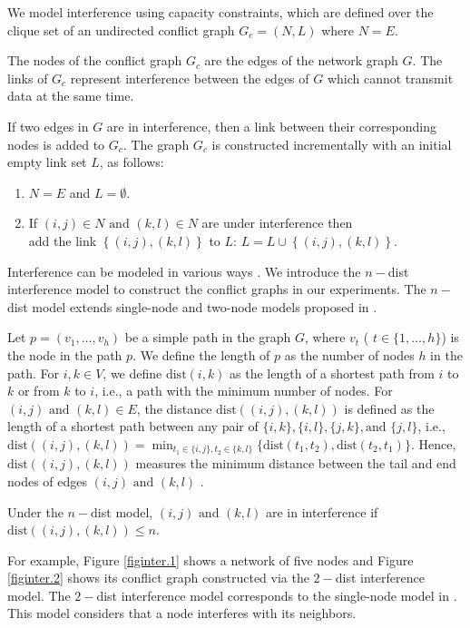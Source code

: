    We model interference using capacity constraints, which are defined over the clique set of an undirected conflict graph \(G_c = (N, L) \) where \(N = E\).
   
  The nodes of the conflict graph \(G_c\) are the edges of the network graph \(G\). The links of \(G_c\) represent interference between the edges of \(G\) which cannot transmit data at the same time.
 
 If two edges in \(G\) are in interference, then a link between their corresponding nodes is added to \(G_c\).
 The graph \(G_c\) is constructed incrementally with an initial empty link set \(L\), as follows:
\begin{enumerate}
    \item \(N = E\) and \(L = \emptyset\).
    \item If \((i,j) \in N \text{ and } (k,l)\in N \) are under interference then \\
      add  the link  \(\left\{(i,j), (k,l)\right\}\) to \( L \): \( L = L \cup \left\{(i,j),  (k,l) \right\}\).
\end{enumerate}

  Interference can be modeled in various ways \cite{gupta2000capacity}. We introduce the \(n-\)dist interference model to construct the conflict graphs in our experiments. The \(n-\)dist model extends single-node and two-node models proposed in \cite{chaporkar2008throughput}.
 
   Let $p=(v_1,\hdots,v_h)$ be a simple path in the graph $G$, where $v_t$ ( $t \in \{1,\hdots,h\}$) is the node in the path $p$. We define the length of $p$ as the number of nodes $h$ in the path. For $i,k \in V$, we define $\textrm{dist}(i,k)$ as the length of a shortest path from $i$ to $k$ or from $k$ to $i$, i.e., a path with the minimum number of nodes. For \((i,j) \text{ and } (k,l) \in E\), the distance \(\textrm{dist}\left ((i,j), (k,l)\right)\) is defined as the length of a shortest path between any pair of \(\{i, k\}, \{i, l\}, \{j, k\}, \text{and } \{j, l\}\), i.e., $\textrm{dist}\left ((i,j),  (k,l)\right) = \min_{t_1\in\{i,j\},  t_2 \in \{ k,l\}}\{\textrm{dist}(t_1, t_2), \textrm{dist}(t_2, t_1)\}$. Hence, $\textrm{dist}\left ((i,j),  (k,l)\right)$ measures the minimum distance between the tail and end nodes of edges  \((i,j) \text{ and } (k,l)\) .
 
 Under the \(n-\)dist model, \((i,j) \text{ and } (k,l)\) are in interference if \(\textrm{dist}\left ((i,j),  (k,l)\right) \le n\).
 
 
For example, Figure \eqref{figinter.1} shows a network of five nodes and Figure \eqref{figinter.2} shows its conflict graph constructed via the \(2-\)dist interference model. The \(2-\)dist interference model corresponds to the single-node model in \cite{chaporkar2008throughput}. This model considers that a node interferes with its neighbors.  

